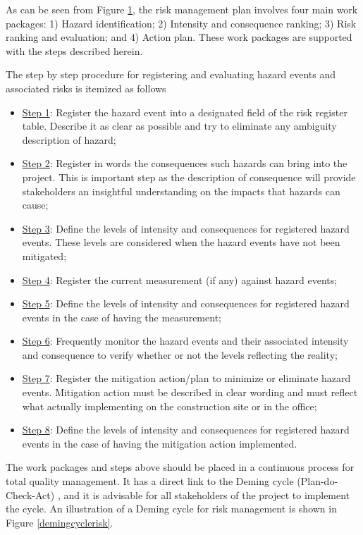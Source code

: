 \documentclass[10pt,halfline,a4paper]{ouparticle}
\begin{document}
\begin{figure}[!ht]
	\label{riskmethodology} 
\end{figure}

As can be seen from Figure \ref{riskmethodology}, the risk management plan involves four main work packages: 1) Hazard identification; 2) Intensity and consequence ranking; 3) Risk ranking and evaluation; and 4) Action plan. These work packages are supported with the steps described herein.

The step by step procedure for registering and evaluating hazard events and associated risks is itemized as follows

\begin{itemize}
	\item \underline{Step 1}: Register the hazard event into a designated field of the risk register table. Describe it as clear as possible and try to eliminate any ambiguity description of hazard;
	\item \underline{Step 2}: Register in words the consequences such hazards can bring into the project. This is important step as the description of consequence will provide stakeholders an insightful understanding on the impacts that hazards can cause;
	\item \underline{Step 3}: Define the levels of intensity and consequences for registered hazard events. These levels are considered when the hazard events have not been mitigated; 
	\item \underline{Step 4}: Register the current measurement (if any) against hazard events;
	\item \underline{Step 5}: Define the levels of intensity and consequences for registered hazard events in the case of having the measurement; 
	\item \underline{Step 6}: Frequently monitor the hazard events and their associated intensity and consequence to verify whether or not the levels reflecting the reality;
	\item \underline{Step 7}: Register the mitigation action/plan to minimize or eliminate hazard events. Mitigation action must be described in clear wording and must reflect what actually implementing on the construction site or in the office;
	\item \underline{Step 8}: Define the levels of intensity and consequences for registered hazard events in the case of having the mitigation action implemented.
\end{itemize}

The work packages and steps above should be placed in a continuous process for total quality management. It has a direct link to the Deming cycle (Plan-do-Check-Act) \citep{Walton1986}, and it is advisable for all stakeholders of the project to implement the cycle. An illustration of a Deming cycle for risk management is shown in Figure \ref{demingcyclerisk}.
\end{document}
